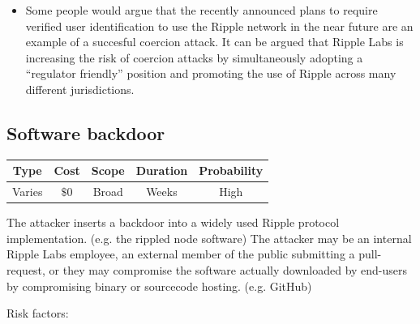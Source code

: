\documentclass{article}
\begin{document}
\begin{itemize}
    \item Some people would argue that the recently announced
        plans\cite{cointelegraph-ripple-aml} to require verified user
        identification to use the Ripple network in the near future are an
        example of a succesful coercion attack. It can be argued that Ripple
        Labs is increasing the risk of coercion attacks by simultaneously
        adopting a ``regulator friendly'' position and promoting the use of
        Ripple across many different jurisdictions.

\end{itemize}

\subsection{Software backdoor}

\begin{center}
    \begin{tabular}{c|c|c|c|c}
        Type & Cost & Scope & Duration & Probability \\ \hline
        Varies & $\$0$ & Broad & Weeks & High \\
    \end{tabular}
\end{center}

The attacker inserts a backdoor into a widely used Ripple protocol
implementation. (e.g. the rippled node software) The attacker may be an
internal Ripple Labs employee, an external member of the public submitting a
pull-request, or they may compromise the software actually downloaded by
end-users by compromising binary or sourcecode hosting. (e.g. GitHub)

Risk factors:
\end{document}
